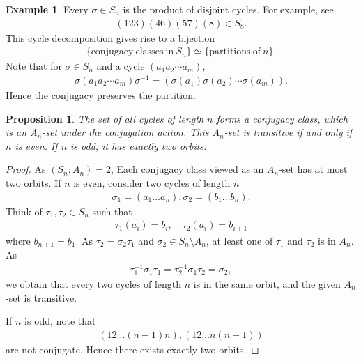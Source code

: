\documentclass[12pt]{report}
\theoremstyle{plain}
\newtheorem{proposition}[theorem]{Proposition}
\theoremstyle{remark}
\theoremstyle{definition}
\newtheorem{example}[theorem]{Example}
\begin{document}
\begin{example}
    Every $\sigma\in S_n$ is the product of disjoint cycles. For example, see
    \begin{align*}
        (123)(46)(57)(8)\in S_8.
    \end{align*}
    This cycle decomposition gives rise to a bijection
    \begin{align*}
        \{\mathrm{conjugacy~classes~in~}S_n\}\simeq \{\mathrm{partitions~of~}n\}.
    \end{align*}
    Note that for $\sigma\in S_n$ and a cycle $(a_1a_2\cdots a_m)$,
    \begin{align*}
        \sigma(a_1a_2\cdots a_m)\sigma^{-1}=(\sigma(a_1)\sigma(a_2)\cdots\sigma(a_m)).
    \end{align*}
    Hence the conjugacy preserves the partition.
\end{example}

\begin{proposition}
    The set of all cycles of length $n$ forms a conjugacy class, which is an $A_n$-set under the conjugation action. This $A_n$-set is transitive if and only if $n$ is even. If $n$ is odd, it has exactly two orbits.
\end{proposition}
\begin{proof}
    As $(S_n:A_n)=2$, Each conjugacy class viewed as an $A_n$-set has at most two orbits. If $n$ is even, consider two cycles of length $n$
    \begin{align*}
        \sigma_1 = (a_1\dots a_n), \sigma_2 = (b_1\dots b_n).
    \end{align*}
    Think of $\tau_1, \tau_2\in S_n$ such that
    \begin{align*}
        \tau_1(a_i)=b_i,\quad \tau_2(a_i)=b_{i+1}
    \end{align*}
    where $b_{n+1}=b_1$. As $\tau_2 = \sigma_2\tau_1$ and $\sigma_2\in S_n\setminus A_n$, at least one of $\tau_1$ and $\tau_2$ is in $A_n$. As
    \begin{align*}
        \tau_1^{-1}\sigma_1\tau_1 = \tau_2^{-1}\sigma_1\tau_2 = \sigma_2,
    \end{align*}
    we obtain that every two cycles of length $n$ is in the same orbit, and the given $A_n$-set is transitive.

    If $n$ is odd, note that
    \begin{align*}
        (12\dots (n-1)n),(12\dots n(n-1))
    \end{align*}
    are not conjugate. Hence there exists exactly two orbits.
\end{proof}
\end{document}
